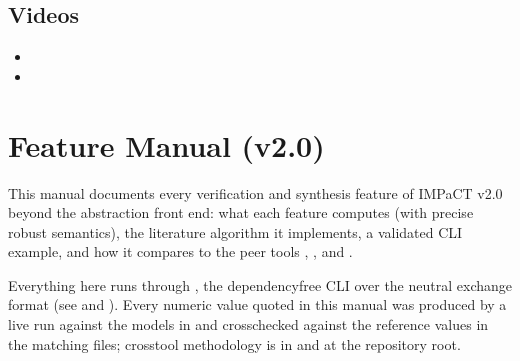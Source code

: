 \documentclass[a4paper,10pt,english]{sphinxmanual}
\begin{document}
\subsection{Videos}
\label{\detokenize{user-guide/makefiles:videos}}\begin{itemize}
\item {} 
\sphinxAtStartPar
{}

\item {} 
\sphinxAtStartPar
{}

\end{itemize}

\sphinxstepscope


\section{Feature Manual (v2.0)}
\label{\detokenize{manual/index:feature-manual-v2-0}}\label{\detokenize{manual/index::doc}}
\sphinxAtStartPar
This manual documents every verification and synthesis feature of IMPaCT v2.0 beyond
the abstraction front end: what each feature computes (with precise robust semantics),
the literature algorithm it implements, a validated CLI example, and how it compares to
the peer tools , , and .

\sphinxAtStartPar
Everything here runs through , the dependency\sphinxhyphen{}free CLI over the
neutral  exchange format (see {\hyperref[\detokenize{manual/formats::doc}]{}} and {\hyperref[\detokenize{manual/cli::doc}]{}}). Every numeric value
quoted in this manual was produced by a live run against the models in
 and cross\sphinxhyphen{}checked against the reference values in the
matching  files; cross\sphinxhyphen{}tool methodology is in  and
 at the repository root.
\end{document}
